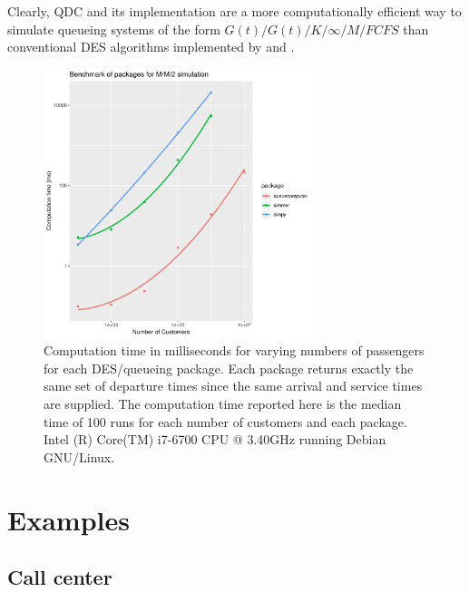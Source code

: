\documentclass[article]{jss}
\begin{document}
Clearly, QDC and its implementation  are a more computationally efficient way to simulate queueing systems of the form $G(t)/G(t)/K/\infty/M/\mathit{FCFS}$ than conventional DES algorithms implemented by  and . 

\begin{figure}[t!]
  \centering
  \includegraphics[width = 0.7\textwidth, trim = 0 5 0 5, clip]{benchmark_083.pdf}
  \caption{Computation time in milliseconds for varying numbers of
    passengers for each DES/queueing package. Each package returns
    exactly the same set of departure times since the same arrival and
    service times are supplied. The computation time reported here is
    the median time of 100 runs for each number of customers and each
    package. Intel (R) Core(TM) i7-6700 CPU @ 3.40GHz running Debian
    GNU/Linux.  }
  \label{fig:bm_numberofpassengers}
\end{figure}

\section{Examples} \label{sec:Examples}

\subsection{Call center} \label{ssec:callcenter}
\end{document}
